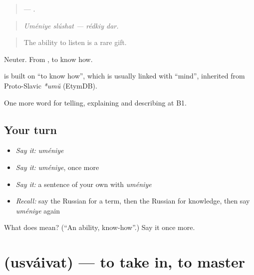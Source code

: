 \begin{quote}
  —  .
\end{quote}

\begin{quote}
\emph{Uméniye slúshat — rédkiy dar.}
\end{quote}

\begin{quote}
The ability to listen is a rare gift.
\end{quote}

Neuter. From \emph{}, to know how.

\begin{cousinweb}
\textbf{} is built on \emph{} \textquotedblleft{}to know how\textquotedblright{}, which is usually linked with \emph{} \textquotedblleft{}mind\textquotedblright{}, inherited from Proto-Slavic \emph{*umŭ} (EtymDB).
\end{cousinweb}

\begin{grammarlens}[title={What you've built}]
One more word for telling, explaining and describing at B1.
\end{grammarlens}

\subsection*{Your turn}
\begin{itemize}
\raggedright
  \item \emph{Say it:} \emph{uméniye}
  \item \emph{Say it:} \emph{uméniye}, once more
  \item \emph{Say it:} a sentence of your own with \emph{uméniye}
  \item \emph{Recall:} say the Russian for a term, then the Russian for knowledge, then say \emph{uméniye} again
\end{itemize}

\begin{tcolorbox}[breakable,colback=teal!4,colframe=teal!35!black,title={Before you move on}]
What does  mean? (\textquotedblleft{}An ability, know-how\textquotedblright{}.) Say it once more.
\end{tcolorbox}
\section[\texorpdfstring{\ru{усваивать} (usváivat)}{усваивать (usváivat)}]{ (usváivat) — to take in, to master}

